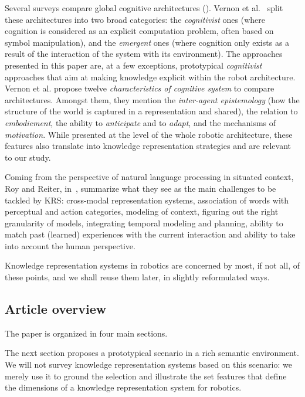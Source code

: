\documentclass[a4paper, twocolumn]{article}
\begin{document}
Several surveys compare global cognitive architectures (\cite{Vernon2007, Chong2009}).
Vernon et al.~\cite{Vernon2007} split these architectures into two broad
categories: the \emph{cognitivist} ones (where cognition is considered as an
explicit computation problem, often based on symbol manipulation), and the
\emph{emergent} ones (where cognition only exists as a result of the
interaction of the system with its environment). The approaches presented in
this paper are, at a few exceptions, prototypical \emph{cognitivist} approaches
that aim at making knowledge explicit within the robot architecture. Vernon et
al. propose twelve \emph{characteristics of cognitive system} to compare
architectures. Amongst them, they mention the \emph{inter-agent epistemology} (how
the structure of the world is captured in a representation and shared), the
relation to \emph{embodiement}, the ability to \emph{anticipate} and to
\emph{adapt}, and the mechanisms of \emph{motivation}. While presented at the
level of the whole robotic architecture, these features also translate into
knowledge representation strategies and are relevant to our study.

Coming from the perspective of natural language processing in situated context,
Roy and Reiter, in~\cite{Roy2005}, summarize what they see as the main
challenges to be tackled by KRS: cross-modal representation systems, association of
words with perceptual and action categories, modeling of context, figuring out
the right granularity of models, integrating temporal modeling and planning,
ability to match past (learned) experiences with the current interaction and
ability to take into account the human perspective.

Knowledge representation systems in robotics are concerned by most, if not all,
of these points, and we shall reuse them later, in slightly reformulated ways.

\subsection{Article overview}
\label{sect|overview}

The paper is organized in four main sections.

The next section proposes a prototypical scenario in a rich semantic
environment. We will not survey knowledge representation systems based on this
scenario: we merely use it to ground the selection and illustrate the set
features that define the dimensions of a
knowledge representation system for robotics.
\end{document}
